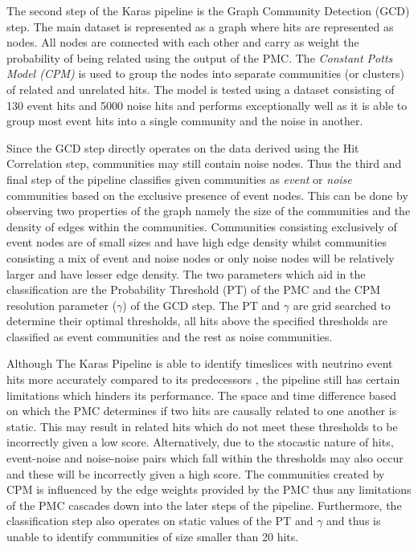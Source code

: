 The second step of the Karas pipeline is the Graph Community Detection
(GCD) step. The main dataset is represented as a graph where hits are
represented as nodes. All nodes are connected with each other and
carry as weight the probability of being related using the output of
the PMC. The \emph{Constant Potts Model (CPM)} \cite{traag2011narrow}
is used to group the nodes into separate communities (or clusters) of
related and unrelated hits. The model is tested using a dataset
consisting of 130 event hits and 5000 noise hits and performs
exceptionally well as it is able to group most event hits into a
single community and the noise in another.

Since the GCD step directly operates on the data derived using the Hit
Correlation step, communities may still contain noise nodes. Thus the
third and final step of the pipeline classifies given communities as
\emph{event} or \emph{noise} communities based on the exclusive
presence of event nodes. This can be done by observing two properties
of the graph namely the size of the communities and the density of
edges within the communities. Communities consisting exclusively of
event nodes are of small sizes and have high edge density whilst
communities consisting a mix of event and noise nodes or only noise
nodes will be relatively larger and have lesser edge density. The two
parameters which aid in the classification are the Probability
Threshold (PT) of the PMC and the CPM resolution parameter ($\gamma$)
of the GCD step. The PT and $\gamma$ are grid searched to determine
their optimal thresholds, all hits above the specified thresholds are
classified as event communities and the rest as noise communities.

Although The Karas Pipeline is able to identify timeslices with
neutrino event hits more accurately compared to its predecessors
\cite{karas2019data}, the pipeline still has certain limitations which
hinders its performance. The space and time difference based on which
the PMC determines if two hits are causally related to one another is
static. This may result in related hits which do not meet these
thresholds to be incorrectly given a low score. Alternatively, due to
the stocastic nature of hits, event-noise and noise-noise pairs which
fall within the thresholds may also occur and these will be
incorrectly given a high score. The communities created by CPM is
influenced by the edge weights provided by the PMC thus any
limitations of the PMC cascades down into the later steps of the
pipeline. Furthermore, the classification step also operates on static
values of the PT and $\gamma$ and thus is unable to identify
communities of size smaller than 20 hits.

